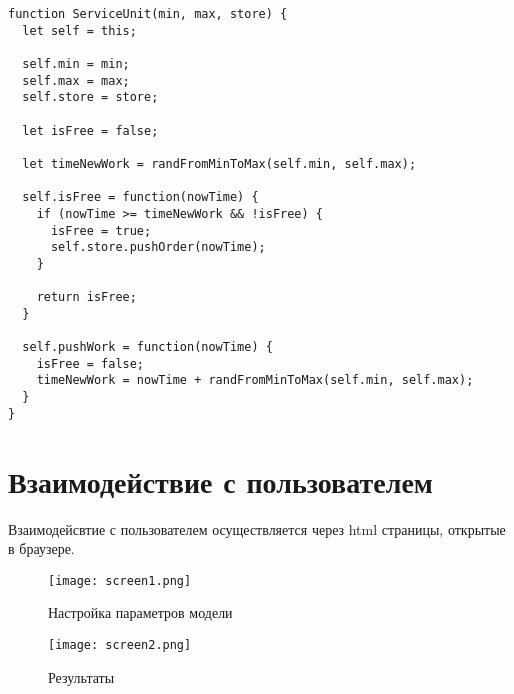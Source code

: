 \begin{lstlisting}[caption={Программная модель оператора}]
function ServiceUnit(min, max, store) {
  let self = this;
  
  self.min = min;
  self.max = max;
  self.store = store;

  let isFree = false;
  
  let timeNewWork = randFromMinToMax(self.min, self.max);

  self.isFree = function(nowTime) {
    if (nowTime >= timeNewWork && !isFree) {
      isFree = true;
      self.store.pushOrder(nowTime);  
    } 

    return isFree;
  }

  self.pushWork = function(nowTime) {
    isFree = false;
    timeNewWork = nowTime + randFromMinToMax(self.min, self.max);
  }
} 

\end{lstlisting}


\section{Взаимодействие с пользователем}

Взаимодейсвтие с пользователем осуществляется через html страницы, открытые в браузере.

\begin{figure}
  \centering
  \texttt{[image: screen1.png]}
  \caption{Настройка параметров модели}
\end{figure}

\begin{figure}
  \centering
  \texttt{[image: screen2.png]}
  \caption{Результаты}
\end{figure}